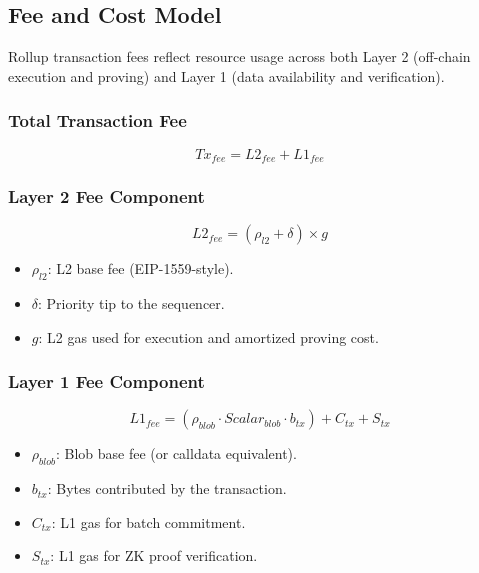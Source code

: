 \subsection{Fee and Cost Model}

Rollup transaction fees reflect resource usage across both Layer 2 (off-chain execution and proving) and Layer 1 (data availability and verification).

\subsubsection{Total Transaction Fee}

\begin{equation}
Tx_{fee} = L2_{fee} + L1_{fee}
\end{equation}

\subsubsection{Layer 2 Fee Component}

\begin{equation}
L2_{fee} = (\rho_{l2} + \delta) \times g
\end{equation}

\begin{itemize}[leftmargin=1.5em]
    \item $\rho_{l2}$: L2 base fee (EIP-1559-style).
    \item $\delta$: Priority tip to the sequencer.
    \item $g$: L2 gas used for execution and amortized proving cost.
\end{itemize}

\subsubsection{Layer 1 Fee Component}

\begin{equation}
L1_{fee} = (\rho_{blob} \cdot Scalar_{blob} \cdot b_{tx}) + C_{tx} + S_{tx}
\end{equation}

\begin{itemize}[leftmargin=1.5em]
    \item $\rho_{blob}$: Blob base fee (or calldata equivalent).
    \item $b_{tx}$: Bytes contributed by the transaction.
    \item $C_{tx}$: L1 gas for batch commitment.
    \item $S_{tx}$: L1 gas for ZK proof verification.
\end{itemize}

